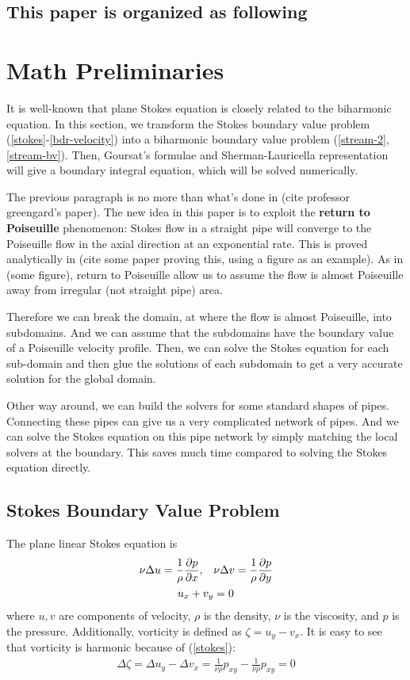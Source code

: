 \documentclass[11pt]{article}
\newtheorem[L]{thm}{Theorem}[section]
\begin{document}
\subsection{This paper is organized as following}

\section{Math Preliminaries}

It is well-known that plane Stokes equation is closely related to the biharmonic equation. In this section, we transform the Stokes boundary value problem (\ref{stokes}-\ref{bdr-velocity}) into a biharmonic boundary value problem (\ref{stream-2},\ref{stream-bv}). Then, Goursat's formulae and Sherman-Lauricella representation will give a boundary integral equation, which will be solved numerically. 

The previous paragraph is no more than what's done in (cite professor greengard's paper). The new idea in this paper is to exploit the \textbf{return to Poiseuille} phenomenon: Stokes flow in a straight pipe will converge to the Poiseuille flow in the axial direction at an exponential rate. This is proved analytically in (cite some paper proving this, using a figure as an example). As in (some figure), return to Poiseuille allow us to assume the flow is almost Poiseuille away from irregular (not straight pipe) area. 

Therefore we can break the domain, at where the flow is almost Poiseuille, into subdomains. And we can assume that the subdomains have the boundary value of a Poiseuille velocity profile. Then, we can solve the Stokes equation for each sub-domain and then glue the solutions of each subdomain to get a very accurate solution for the global domain. 

Other way around, we can build the solvers for some standard shapes of pipes. Connecting these pipes can give us a very complicated network of pipes. And we can solve the Stokes equation on this pipe network by simply matching the local solvers at the boundary. This saves much time compared to solving the Stokes equation directly. 


\subsection{Stokes Boundary Value Problem}

The plane linear Stokes equation is
\begin{align}
  \nu \Delta u = \frac 1 \rho \pdv{p}{x},\quad &\nu \Delta v = \frac 1\rho \pdv{p}{y} 
  \label{stokes} \\
  u_x + v_y &= 0
  \label{continuity}
\end{align}
where $u,v$ are components of velocity, $\rho$ is the density, $\nu$ is the viscosity, and $p$ is the pressure. Additionally, vorticity is defined as $\zeta  = u_y - v_x$. It is easy to see that vorticity is harmonic because of (\ref{stokes}):
\begin{align}
  \Delta \zeta = \Delta u_y - \Delta v_x = \frac 1{\nu \rho} p_{xy} -  \frac 1{\nu \rho} p_{xy} =0 \label{vorticity-harmonic}
\end{align}
\end{document}
